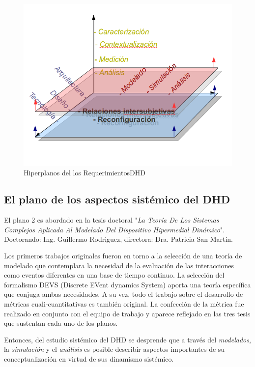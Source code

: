 \begin{figure}
\begin{center}
 \includegraphics[width=4 in,totalheight=3 in] {DHD/hiperplanosDHD}
\caption{Hiperplanos del los RequerimientosDHD} \label{hiperplanos}
\end{center}
\end{figure}


\subsection{El plano de los aspectos sistémico del DHD}

El plano 2 es abordado en la tesis doctoral "\textit{La Teoría De Los Sistemas
Complejos Aplicada Al Modelado Del Dispositivo Hipermedial Dinámico}".
Doctorando: Ing. Guillermo Rodriguez, directora: Dra. Patricia San Martín. 

Los primeros trabajos originales fueron en torno a la selección de una teoría de
modelado que contemplara la necesidad de la evaluación de las interacciones como
eventos diferentes en una base de tiempo continuo. La selección del formalismo
DEVS (Discrete EVent dynamics System) aporta una teoría específica que
conjuga ambas necesidades. A su vez, todo el trabajo sobre el desarrollo de
métricas cuali-cuantitativas es también original. La confección de la métrica
fue realizado en conjunto con el equipo de trabajo y aparece reflejado en las
tres tesis que sustentan cada uno de los planos. 

Entonces, del estudio sistémico del DHD se desprende que a través del
\textit{modelados}, la \textit{simulación} y el \textit{análisis} es  posible
describir aspectos importantes de su conceptualización en virtud de sus
dinamismo sistémico.


